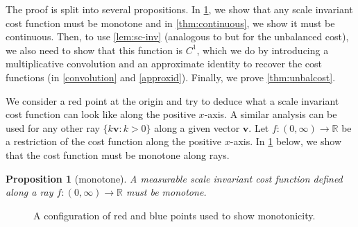 \documentclass{article}
\newtheorem{proposition}{Proposition}
\begin{document}
The proof is split into several propositions. In \cref{thm:monotone},
we show that any scale invariant cost
function must be monotone and in \cref{thm:continuous}, we show it must
be continuous. Then, %
to use \cref{lem:sc-inv} (analogous to  \cite[Proposition
18]{minimal} but for the unbalanced cost), we also need to
show that this function is $C^1$, which we do by introducing a multiplicative
convolution and an approximate identity to recover the cost functions (in
\cref{convolution} and
\cref{approxid}).  Finally, we prove \cref{thm:unbalcost}.



We consider a red point at the origin
and  try
to deduce what a scale invariant cost function can look like along the positive $x$-axis.
A similar analysis can be used for any other ray $\{k \mathbf{v}:k>0\}$ along a given
vector $\mathbf{v}$.
Let $f:(0,\infty)\rightarrow\mathbb{R}$ be a
restriction of the cost function along the positive $x$-axis. In
\cref{thm:monotone}
 below, we show that the cost function must be monotone along rays.

\begin{proposition}[monotone]\label{thm:monotone}
  A measurable scale invariant cost function defined along a ray $f:(0,\infty)\rightarrow \mathbb{R}$ must be
  monotone.
\end{proposition}

\begin{figure}%
  \centering
  \caption{A configuration of red and blue points used to show
  monotonicity.}\label{fig:monotone}
\end{figure}
\end{document}
